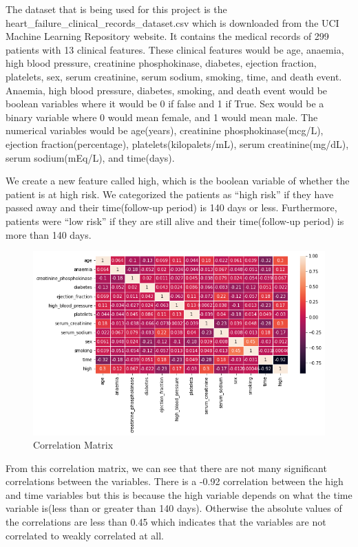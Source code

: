 \documentclass[11pt]{article}
\begin{document}
{The dataset that is being used for this project is the
heart\_failure\_clinical\_records\_dataset.csv which is downloaded from
the UCI Machine Learning Repository website. It contains the medical
records of 299 patients with 13 clinical features. These clinical
features would be age, anaemia, high blood pressure, }{creatinine
phosphokinase, diabetes, ejection fraction, platelets, sex, serum
creatinine, serum sodium, smoking, time, and death event. Anaemia, high
blood pressure, diabetes, smoking, and death event would be boolean
variables where it would be 0 if false and 1 if True. Sex would be a
binary variable where 0 would mean female, and 1 would mean male. The
numerical variables would be age(years), creatinine
phosphokinase(mcg/L), ejection fraction(percentage),
platelets(kilopalets/mL), serum creatinine(mg/dL), serum sodium(mEq/L),
and time(days).}

{We create a new feature called high, which is the boolean variable of
whether the patient is at high risk. We categorized the patients as
``high risk'' if they have passed away and their time(follow-up period)
is 140 days or less. Furthermore, patients were ``low risk'' if they are
still alive and their time(follow-up period) is more than 140 days. }

\begin{figure}[H]
	\centering
	\includegraphics[width=7.5in]{figures/correlation_matrix.png}
	\caption{Correlation Matrix}\label{fig:figures/correlation_matrix.png}
\end{figure}

{From this correlation matrix, we can see that there are not many
significant correlations between the variables. There is a -0.92
correlation between the high and time variables but this is because the
high variable depends on what the time variable is(less than or greater
than 140 days). Otherwise the absolute values of the correlations are
less than 0.45 which indicates that the variables are not correlated to
weakly correlated at all. }
\end{document}
